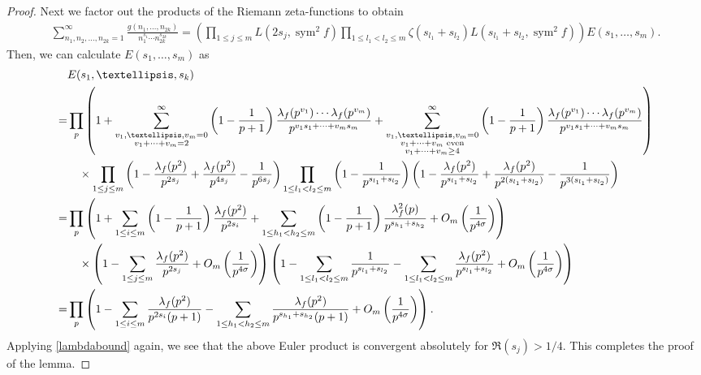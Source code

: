 \documentclass[10pt,a4paper]{amsart}
\begin{document}
\begin{proof}
Next we factor out the products of the Riemann zeta-functions to obtain
\begin{align*}
\sum_{n_1, n_2, \ldots, n_{2k}=1}^{\infty} \frac{g(n_1, \ldots, n_{2k})}{n_1^{s_1} \cdots n_{2k}^{s_{2k}}} = \left( \prod_{1 \leq j \leq m} L(2s_j, \operatorname{sym}^2f ) \prod_{1 \leq l_1 < l_2 \leq m} \zeta(s_{l_1} + s_{l_2})L (s_{l_1} + s_{l_2},\operatorname{sym}^2f)\right) E(s_1, \ldots, s_{m}).
\end{align*}
Then, we can calculate \( E(s_1, \ldots, s_{m}) \) as
\begin{align*}
&E(s_1, \ldots, s_k) \\
= &\prod_p \left( 1 + \sum^{\infty}_{\begin{subarray}{c} v_1, \ldots, v_{m}=0 \\ v_1 + \cdots + v_{m} = 2 \end{subarray}} \left( 1 - \frac{1}{p+1} \right) \frac{\lambda_f(p^{v_1})\cdots \lambda_f(p^{v_m})}{p^{v_1 s_1 + \cdots + v_{m} s_{m}}}
+ \sum^{\infty}_{\substack{v_1, \dots, v_m = 0 \\ v_1 + \cdots + v_{m} \text{ even}\\v_1+\cdots+v_m\geq 4}} \left( 1 - \frac{1}{p+1} \right) \frac{\lambda_f(p^{v_1})\cdots \lambda_f(p^{v_m})}{p^{v_1 s_1 + \cdots + v_{m} s_{m}}}\right)\\
&\quad \times \prod_{1 \leq j \leq m} \left( 1 - \frac{\lambda_f(p^2)}{p^{2s_j}}+\frac{\lambda_f(p^2)}{p^{4s_j}}-\frac{1}{p^{6s_j}} \right) \prod_{1 \leq l_1 < l_2 \leq m} \left( 1 - \frac{1}{p^{s_{l_1} + s_{l_2}}} \right)\left( 1 - \frac{\lambda_f(p^2)}{p^{s_{l_1}+s_{l_2}}}+\frac{\lambda_f(p^2)}{p^{2(s_{l_1}+s_{l_2})}}-\frac{1}{p^{3(s_{l_1}+s_{l_2})}} \right)\\
=& \prod_p \left( 1 + \sum_{1 \leq i \leq m} \left( 1 - \frac{1}{p+1} \right) \frac{\lambda_f(p^2)}{p^{2s_i}} + \sum_{1 \leq h_1 < h_2 \leq m} \left( 1 - \frac{1}{p+1} \right) \frac{\lambda_f^2(p)}{p^{s_{h_1} + s_{h_2}}} + O_m \left( \frac{1}{p^{4\sigma}} \right) \right)\\
&\quad \times \left( 1 - \sum_{1 \leq j \leq m} \frac{\lambda_f(p^2)}{p^{2s_j}} + O_m \left( \frac{1}{p^{4\sigma}} \right) \right) \left( 1 - \sum_{1 \leq l_1 < l_2 \leq m} \frac{1}{p^{s_{l_1} + s_{l_2}}}- \sum_{1 \leq l_1 < l_2 \leq m} \frac{\lambda_f(p^2)}{p^{s_{l_1} + s_{l_2}}} + O_m \left( \frac{1}{p^{4\sigma}} \right) \right)\\
=& \prod_p \left( 1 -  \sum_{1 \leq i \leq m} \frac{\lambda_f(p^2)}{p^{2s_i}(p+1)} - \sum_{1 \leq h_1 < h_2 \leq m} \frac{\lambda_f(p^2)}{p^{s_{h_1} + s_{h_2} }(p+1)} + O_m \left( \frac{1}{p^{4\sigma}} \right) \right).
\end{align*}
Applying \eqref{lambdabound} again, we see that the above Euler product is convergent absolutely for \(\Re(s_j) > 1/4\). This completes the proof of the lemma.
\end{proof}
\end{document}
